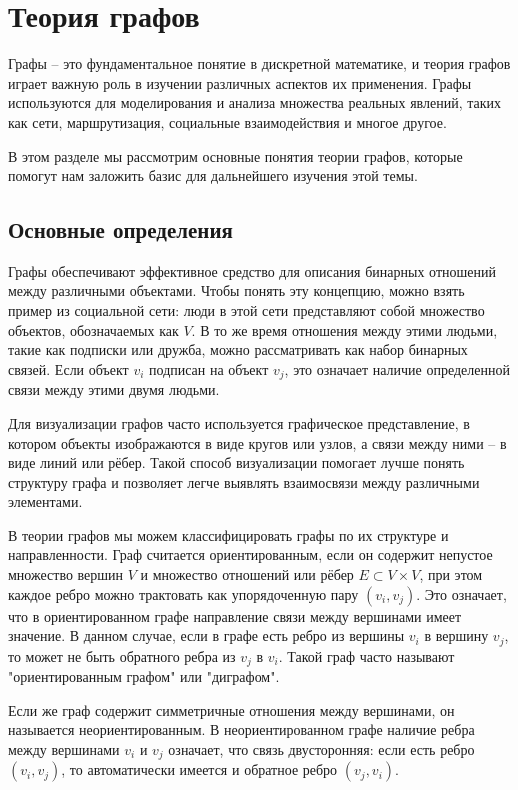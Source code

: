 \section{Теория графов}

Графы -- это фундаментальное понятие в дискретной математике, и теория графов играет важную роль в изучении различных аспектов их применения. Графы используются для моделирования и анализа множества реальных явлений, таких как сети, маршрутизация, социальные взаимодействия и многое другое.

В этом разделе мы рассмотрим основные понятия теории графов, которые помогут нам заложить базис для дальнейшего изучения этой темы.

\subsection{Основные определения}

Графы обеспечивают эффективное средство для описания бинарных отношений между различными объектами. Чтобы понять эту концепцию, можно взять пример из социальной сети: люди в этой сети представляют собой множество объектов, обозначаемых как $V$. В то же время отношения между этими людьми, такие как подписки или дружба, можно рассматривать как набор бинарных связей. Если объект $v_i$ подписан на объект $v_j$, это означает наличие определенной связи между этими двумя людьми.

Для визуализации графов часто используется графическое представление, в котором объекты изображаются в виде кругов или узлов, а связи между ними – в виде линий или рёбер. Такой способ визуализации помогает лучше понять структуру графа и позволяет легче выявлять взаимосвязи между различными элементами.

В теории графов мы можем классифицировать графы по их структуре и направленности. Граф считается ориентированным, если он содержит непустое множество вершин $V$ и множество отношений или рёбер $E \subset V \times V$, при этом каждое ребро можно трактовать как упорядоченную пару $(v_i, v_j)$. Это означает, что в ориентированном графе направление связи между вершинами имеет значение. В данном случае, если в графе есть ребро из вершины $v_i$ в вершину $v_j$, то может не быть обратного ребра из $v_j$ в $v_i$. Такой граф часто называют "ориентированным графом" или "диграфом".

Если же граф содержит симметричные отношения между вершинами, он называется неориентированным. В неориентированном графе наличие ребра между вершинами $v_i$ и $v_j$ означает, что связь двусторонняя: если есть ребро $(v_i, v_j)$, то автоматически имеется и обратное ребро $(v_j, v_i)$.

